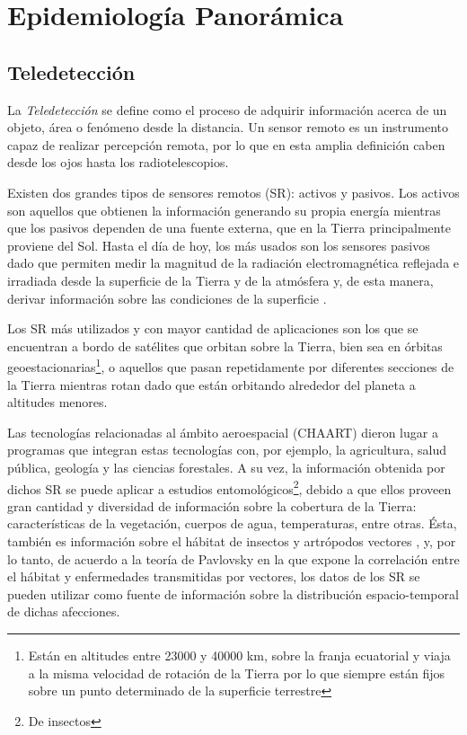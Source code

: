 



\section{Epidemiología Panorámica}

\justifying

\subsection{Teledetección}

\par La \textit{Teledetección} se define como el proceso de adquirir
  información acerca de un objeto, área o fenómeno desde la distancia.
  Un sensor remoto es un instrumento capaz de realizar percepción remota, por lo
  que en esta amplia definición caben desde los ojos hasta los
  radiotelescopios.

\par Existen dos grandes tipos de sensores remotos (SR): activos y pasivos.
  Los activos son aquellos que obtienen la información generando su propia energía
  mientras que los pasivos dependen de una fuente externa, que en la Tierra
  principalmente proviene del Sol. Hasta el día de hoy, los más usados son los
  sensores pasivos dado que permiten medir la magnitud de la radiación electromagnética
  reflejada e irradiada desde la superficie de la Tierra y de la atmósfera y,
  de esta manera, derivar información sobre las condiciones de la superficie \cite{cami_tartagal}.


\par Los SR más utilizados y con mayor cantidad de aplicaciones son los que se
  encuentran a bordo de satélites que orbitan sobre la Tierra, bien sea
  en órbitas geoestacionarias\footnote{Están en altitudes entre 23000 y 40000 km,
  sobre la franja ecuatorial y viaja a la misma velocidad de rotación de la Tierra
  por lo que siempre están fijos sobre un punto determinado de la superficie terrestre},
  o aquellos que pasan repetidamente por diferentes secciones de la Tierra mientras
  rotan dado que están orbitando alrededor del planeta a altitudes menores.


\par Las tecnologías relacionadas al ámbito aeroespacial (CHAART) dieron lugar a programas
  que integran estas tecnologías con, por ejemplo, la agricultura, salud pública,
  geología y las ciencias forestales.
  A su vez, la información obtenida por dichos SR se puede aplicar a estudios
  entomológicos\footnote{De insectos}, debido a que ellos proveen gran cantidad
  y diversidad de información sobre la cobertura de la Tierra: características
  de la vegetación, cuerpos de agua, temperaturas, entre otras. Ésta, también es
  información sobre el hábitat de insectos y artrópodos vectores \cite{estallo_ndwi, data_driven_prediction},
  y, por lo tanto, de acuerdo a la teoría de Pavlovsky \cite{nidality} en la que
  expone la correlación entre el hábitat y enfermedades transmitidas por vectores,
  los datos de los SR se pueden utilizar como fuente de información sobre la
  distribución espacio-temporal de dichas afecciones.


